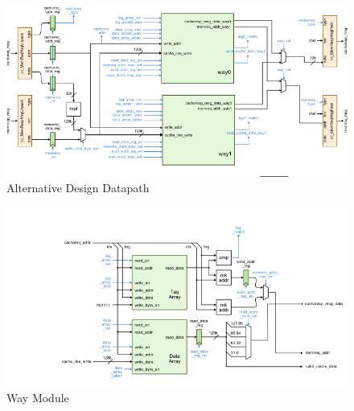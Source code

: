 \documentclass[10pt]{article}
\begin{document}

\begin{figure}[b]
\centering
\includegraphics[scale=0.8]{alt}
\caption{Alternative Design Datapath}
\label{fig:alt}
\end{figure}


\begin{figure}[b]
\centering
\includegraphics[scale=0.9]{way}
\caption{Way Module}
\label{fig:way}
\end{figure}
\end{document}
